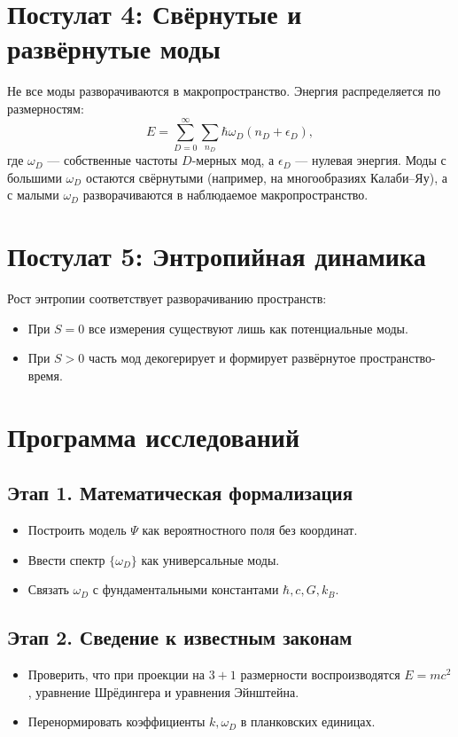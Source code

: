 \documentclass[12pt,a4paper]{article}
\begin{document}
\section{Постулат 4: Свёрнутые и развёрнутые моды}
Не все моды разворачиваются в макропространство. Энергия распределяется по размерностям:
\[
E = \sum_{D=0}^{\infty} \sum_{n_D} \hbar \omega_D \left(n_D + \epsilon_D\right),
\]
где $\omega_D$ — собственные частоты $D$-мерных мод, а $\epsilon_D$ — нулевая энергия.  
Моды с большими $\omega_D$ остаются свёрнутыми (например, на многообразиях Калаби–Яу), а с малыми $\omega_D$ разворачиваются в наблюдаемое макропространство.

\section{Постулат 5: Энтропийная динамика}
Рост энтропии соответствует разворачиванию пространств:
\begin{itemize}
  \item При $S=0$ все измерения существуют лишь как потенциальные моды.
  \item При $S>0$ часть мод декогерирует и формирует развёрнутое пространство-время.
\end{itemize}

\section{Программа исследований}
\subsection*{Этап 1. Математическая формализация}
\begin{itemize}
  \item Построить модель $\Psi$ как вероятностного поля без координат.
  \item Ввести спектр $\{\omega_D\}$ как универсальные моды.
  \item Связать $\omega_D$ с фундаментальными константами $\hbar, c, G, k_B$.
\end{itemize}

\subsection*{Этап 2. Сведение к известным законам}
\begin{itemize}
  \item Проверить, что при проекции на $3+1$ размерности воспроизводятся $E = mc^2$, уравнение Шрёдингера и уравнения Эйнштейна.
  \item Перенормировать коэффициенты $k, \omega_D$ в планковских единицах.
\end{itemize}
\end{document}
